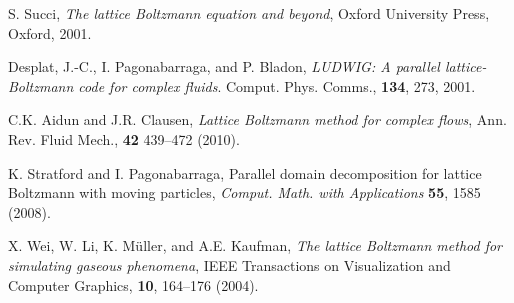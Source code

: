 \begin{thebibliography}{1}




S. Succi, \textit{The lattice Boltzmann equation and beyond},
Oxford University Press, Oxford, 2001.


Desplat, J.-C., I. Pagonabarraga, and P. Bladon,
\textit{LUDWIG: A parallel lattice-Boltzmann code for complex fluids}.
Comput. Phys. Comms., \textbf{134}, 273, 2001.

C.K. Aidun and J.R. Clausen,
\textit{Lattice Boltzmann method for complex flows},
Ann. Rev. Fluid Mech., \textbf{42} 439--472 (2010).




K. Stratford and I. Pagonabarraga,
Parallel domain decomposition for lattice Boltzmann with moving particles,
\textit{Comput. Math. with Applications} \textbf{55}, 1585 (2008).





X. Wei, W. Li, K. M\"uller, and A.E. Kaufman,
\textit{The lattice Boltzmann method for simulating gaseous phenomena},
IEEE Transactions on Visualization and Computer Graphics,
\textbf{10}, 164--176 (2004).


\end{thebibliography}
